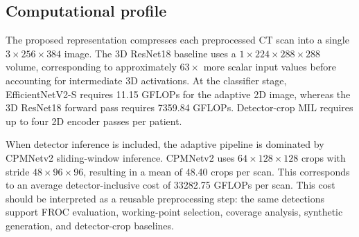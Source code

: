 \documentclass[preprint,12pt]{elsarticle}
\begin{document}
\begin{table}[t]
\centering
\caption{Paired statistical comparisons against Adaptive RBF. Positive $\Delta$ indicates improvement of Adaptive RBF over the comparator.}
\label{tab:stats}
\end{table}

\subsection{Computational profile}

The proposed representation compresses each preprocessed CT scan into a single $3 \times 256 \times 384$ image. The 3D ResNet18 baseline uses a $1 \times 224 \times 288 \times 288$ volume, corresponding to approximately $63\times$ more scalar input values before accounting for intermediate 3D activations. At the classifier stage, EfficientNetV2-S requires 11.15 GFLOPs for the adaptive 2D image, whereas the 3D ResNet18 forward pass requires 7359.84 GFLOPs. Detector-crop MIL requires up to four 2D encoder passes per patient.

When detector inference is included, the adaptive pipeline is dominated by CPMNetv2 sliding-window inference. CPMNetv2 uses $64 \times 128 \times 128$ crops with stride $48 \times 96 \times 96$, resulting in a mean of 48.40 crops per scan. This corresponds to an average detector-inclusive cost of 33282.75 GFLOPs per scan. This cost should be interpreted as a reusable preprocessing step: the same detections support FROC evaluation, working-point selection, coverage analysis, synthetic generation, and detector-crop baselines.
\end{document}
